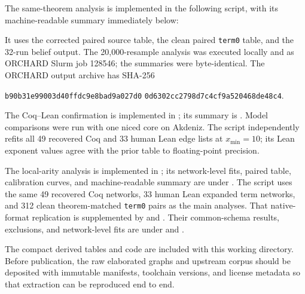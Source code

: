\documentclass[11pt]{article}
\newcommand{\code}[1]{\texttt{#1}}
\begin{document}
The same-theorem analysis is implemented in the following script, with its machine-readable summary
immediately below:
\par\noindent
{}
\par\noindent
{}
\par\noindent
It uses the corrected paired source table, the clean
paired \code{term0} table, and the 32-run belief output.  The 20,000-resample analysis was executed
locally and as ORCHARD Slurm job 128546; the summaries were byte-identical.  The ORCHARD output
archive has SHA-256
\par\noindent
\texttt{b90b31e99003d40ffdc9e8bad9a027d0}\allowbreak
\texttt{0d6302cc2798d7c4cf9a520468de48c4}.

The Coq--Lean confirmation is implemented in
; its summary is
.  Model comparisons were run with one
niced core on Akdeniz.  The script independently refits all 49 recovered Coq and 33 human Lean edge
lists at $x_{\min}=10$; its Lean exponent values agree with the prior table to floating-point
precision.

The local-arity analysis is implemented in
; its network-level fits, paired table, calibration curves,
and machine-readable summary are under
.  The script uses the same 49 recovered Coq networks, 33 human Lean
expanded term networks, and 312 clean theorem-matched \code{term0} pairs as the main analyses.
That native-format replication is supplemented by
 and
.  Their common-schema results, exclusions, and
network-level fits are under  and
.

The compact derived tables and code are included with this working directory.  Before publication,
the raw elaborated graphs and upstream corpus should be deposited with immutable manifests,
toolchain versions, and license metadata so that extraction can be reproduced end to end.



\end{document}
